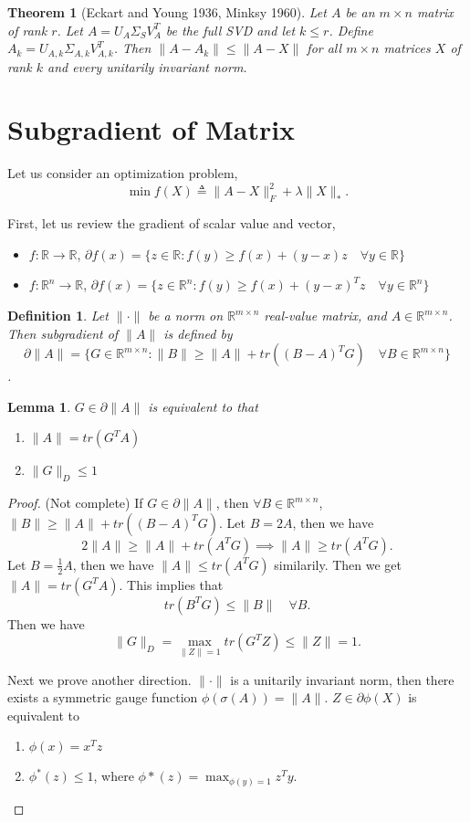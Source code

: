 \documentclass[11pt]{article}
\def\BR{{\mathbb R}}
\newtheorem{theorem}{Theorem}[section]
\newtheorem{lemma}{Lemma}[section]
\newtheorem{definition}{Definition}[section]
\begin{document}
\begin{theorem}[Eckart and Young 1936, Minksy 1960]
 Let $A$ be an $m\times n$ matrix of rank $r$. Let $A = U_A \Sigma_S V_A^T$ be the full SVD and let $k \leq r$. 
 Define $A_k = U_{A,k} \Sigma_{A,k} V_{A,k}^T$.
 Then $\|A - A_k\| \leq \|A - X\|$ for all $m\times n$ matrices $X$ of rank $k$ and every unitarily invariant norm.
\end{theorem}

\section{Subgradient of Matrix}

Let us consider an optimization problem,
\[ \min f(X) \triangleq \|A - X\|_F^2 + \lambda \| X \|_*. \]

First, let us review the gradient of scalar value and vector,
\begin{itemize}
\item $f : \BR \to \BR$, $\partial f(x) = \{ z \in \BR : f(y) \geq f(x) + (y-x)z \quad \forall y\in\BR \}$ 
\item $f : \BR^n \to \BR$, $\partial f(x) = \{z\in\BR^n: f(y) \geq f(x) + (y-x)^Tz\quad\forall y\in\BR^n\}$
\end{itemize}

\begin{definition}
 Let $\|\cdot\|$ be a norm on $\BR^{m \times n}$ real-value matrix, and $A \in \BR^{m \times n}$.
 Then subgradient of $\|A\|$ is defined by 
 \[ \partial \|A\| = \{G\in\BR^{m \times n} : \|B\| \geq \|A\| + tr((B-A)^TG) \quad \forall B\in\BR^{m \times n} \} \].
\end{definition}

\begin{lemma}
 $G \in \partial \|A\|$ is equivalent to that 
\begin{enumerate}
	\item $\|A\| = tr(G^TA)$
	\item $\|G\|_D \leq 1$
\end{enumerate}
\end{lemma}
\begin{proof}(Not complete)
  If $G\in\partial \|A\|$, then $\forall B\in \BR^{m \times n}$, $\|B\| \geq \|A\| + tr((B-A)^T G)$.
  Let $B = 2A$, then we have 
  \[ 2\|A\| \geq \|A\| + tr(A^T G) \implies \|A\| \geq tr(A^T G). \]
  Let $B = \frac{1}{2}A$, then we have $ \|A\| \leq tr(A^T G) $ similarily. Then we get $ \|A\| = tr(G^TA) $.
  This implies that 
  \[ tr(B^T G) \leq \|B\| \quad \forall B. \]
  Then we have
  \[ \|G\|_D = \max_{\|Z\| = 1} tr(G^TZ) \leq \|Z\| = 1.\]
  
  Next we prove another direction.
  $\|\cdot\|$ is a unitarily invariant norm, then there exists a symmetric gauge function $\phi(\sigma(A)) = \|A\|$.\newline
  $ Z \in \partial \phi(X)$ is equivalent to 
  \begin{enumerate}
   \item $\phi(x) = x^T z$
   \item $\phi^*(z) \leq 1$, where $\phi*(z) = \max_{\phi(y) = 1} z^Ty$.
  \end{enumerate}
\end{proof}
\end{document}
